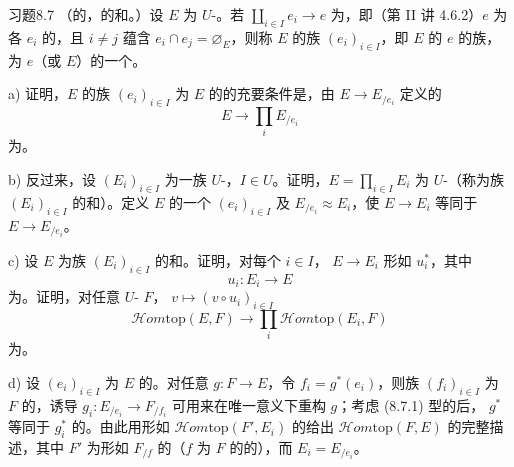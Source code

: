 \begin{SGAresult}{习题}{8.7}
（的，的和。）设 $E$ 为 $U$-。若 $\coprod_{i\in I}e_i\to e$ 为，即（第 II 讲 4.6.2）$e$ 为各 $e_i$ 的，且 $i\ne j$ 蕴含 $e_i\cap e_j=\varnothing_E$，则称 $E$ 的族 $(e_i)_{i\in I}$，即 $E$ 的 $e$ 的族，为 $e$（或 $E$）的一个。

 a) 证明，$E$ 的族 $(e_i)_{i\in I}$ 为 $E$ 的的充要条件是，由 $E\to E_{/e_i}$ 定义的
\[E\longrightarrow\prod_i E_{/e_i}\tag{8.7.1}\]
为。

 b) 反过来，设 $(E_i)_{i\in I}$ 为一族 $U$-，$I\in U$。证明，$E=\prod_{i\in I}E_i$ 为 $U$-（称为族 $(E_i)_{i\in I}$ 的和）。定义 $E$ 的一个 $(e_i)_{i\in I}$ 及 $E_{/e_i}\approx E_i$，使 $E\to E_i$ 等同于 $E\to E_{/e_i}$。

 c) 设 $E$ 为族 $(E_i)_{i\in I}$ 的和。证明，对每个 $i\in I$， $E\to E_i$ 形如 $u_i^*$，其中
\[u_i:E_i\longrightarrow E\tag{8.7.2}\]
为。证明，对任意 $U$- $F$， $v\mapsto(v\circ u_i)_{i\in I}$
\[\mathscr{H}om\mathrm{top}(E,F)\longrightarrow\prod_i\mathscr{H}om\mathrm{top}(E_i,F)\tag{8.7.3}\]
为。

 d) 设 $(e_i)_{i\in I}$ 为 $E$ 的。对任意 $g:F\to E$，令 $f_i=g^*(e_i)$，则族 $(f_i)_{i\in I}$ 为 $F$ 的，诱导 $g_i:E_{/e_i}\to F_{/f_i}$ 可用来在唯一意义下重构 $g$；考虑 (8.7.1) 型的后， $g^*$ 等同于 $g_i^*$ 的。由此用形如 $\mathscr{H}om\mathrm{top}(F',E_i)$ 的给出 $\mathscr{H}om\mathrm{top}(F,E)$ 的完整描述，其中 $F'$ 为形如 $F_{/f}$ 的（$f$ 为 $F$ 的的），而 $E_i=E_{/e_i}$。


\end{SGAresult}
